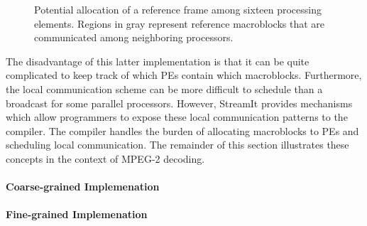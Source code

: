 \begin{figure}[htbp]
\centerline{}
\caption{Potential allocation of a reference frame among sixteen
processing elements.  Regions in gray represent reference macroblocks
that are communicated among neighboring processors.}
\label{fig:mb_alloc}
\end{figure}

The disadvantage of this latter implementation is that it can be quite
complicated to keep track of which PEs contain which macroblocks.
Furthermore, the local communication scheme can be more difficult to
schedule than a broadcast for some parallel processors.  However,
StreamIt provides mechanisms which allow programmers to expose these
local communication patterns to the compiler.  The compiler handles
the burden of allocating macroblocks to PEs and scheduling local
communication. The remainder of this section illustrates these
concepts in the context of MPEG-2 decoding.

\paragraph{Coarse-grained Implemenation}
\paragraph{Fine-grained Implemenation}
